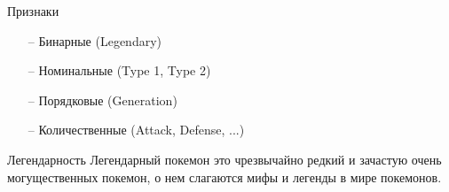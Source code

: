 \documentclass[10pt]{beamer}
\begin{document}
\begin{frame}{Признаки}
	\begin{enumerate} [<+->]	
		\item[--] Бинарные (Legendary)
		\item[--] Номинальные (Type 1, Type 2)
		\item[--] Порядковые (Generation)
		\item[--] Количественные (Attack, Defense, ...)
	\end{enumerate}
\end{frame}

\begin{frame}{Легендарность}
\alert{Легендарный покемон} это чрезвычайно редкий и зачастую очень могущественных покемон, о нем слагаются мифы и легенды в мире покемонов.
\end{frame}
\end{document}
